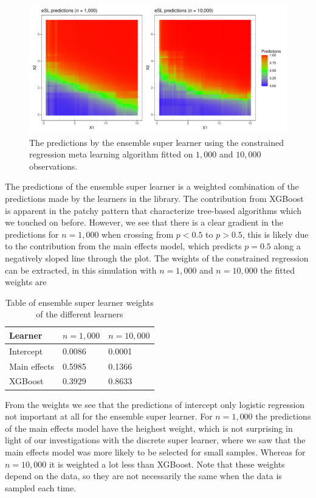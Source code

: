 \documentclass[./main.tex]{subfiles}
\begin{document}
\begin{figure}[H]
    \centering
    \includegraphics[width=\textwidth]{figures/esl_preds_par.pdf}
    \caption{The predictions by the ensemble super learner using the constrained regression meta learning algorithm fitted on $ 1,000 $ and $ 10,000 $ observations.}
    \label{fig:esl_preds_quad_prog}
\end{figure}
The predictions of the ensemble super learner is a weighted combination of the predictions made by the learners in the library. The contribution from XGBoost is apparent in the patchy pattern that characterize tree-based algorithms which we touched on before. However, we see that there is a clear gradient in the predictions for $ n = 1,000 $ when crossing from $ p < 0.5 $ to $ p > 0.5 $, this is likely due to the contribution from the main effects model, which predicts $ p = 0.5 $ along a negatively sloped line through the plot. The weights of the constrained regression can be extracted, in this simulation with $ n = 1,000 $ and $ n = 10,000 $ the fitted weights are
\begin{table}[H]
\centering
\begin{tabular}{lll}
\hline
Learner & $ n = 1,000 $ & $ n = 10,000 $\\
\hline
Intercept & 0.0086 & 0.0001 \\
Main effects & 0.5985 & 0.1366 \\
XGBoost & 0.3929 & 0.8633 \\
\hline
\end{tabular}
\caption{Table of ensemble super learner weights of the different learners}
\end{table}
From the weights we see that the predictions of intercept only logistic regression not important at all for the ensemble super learner. For $ n = 1,000 $ the predictions of the main effects model have the heighest weight, which is not surprising in light of our investigations with the discrete super learner, where we saw that the main effects model was more likely to be selected for small samples. Whereas for $ n = 10,000 $ it is weighted a lot less than XGBoost. Note that these weights depend on the data, so they are not necessarily the same when the data is sampled each time. 
\end{document}
